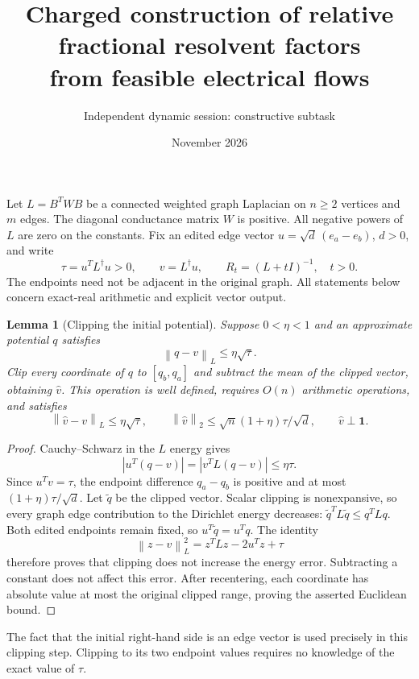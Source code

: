 \documentclass[11pt]{article}
\title{Charged construction of relative fractional resolvent factors\\from feasible electrical flows}
\author{Independent dynamic session: constructive subtask}
\date{November 2026}
\newtheorem{lemma}{Lemma}
\newcommand{\norm}[1]{\left\lVert #1\right\rVert}
\begin{document}
\maketitle

Let $L=B^TWB$ be a connected weighted graph Laplacian on $n\ge2$
vertices and $m$ edges.  The diagonal conductance matrix $W$ is positive.
All negative powers of $L$ are zero on the constants. Fix an edited edge
vector $u=\sqrt d\,(e_a-e_b)$, $d>0$, and write
\[
 \tau=u^TL^\dagger u>0,\qquad v=L^\dagger u,
 \qquad R_t=(L+tI)^{-1},\quad t>0.
\]
The endpoints need not be adjacent in the original graph. All statements
below concern exact-real arithmetic and explicit vector output.

\begin{lemma}[Clipping the initial potential]\label{lem:clip}
Suppose $0<\eta<1$ and an approximate potential $q$ satisfies
\[
 \norm{q-v}_L\le\eta\sqrt\tau.
\]
Clip every coordinate of $q$ to $[q_b,q_a]$ and subtract the mean of
the clipped vector, obtaining $\widehat v$. This operation is well
defined, requires $O(n)$ arithmetic operations, and satisfies
\[
 \norm{\widehat v-v}_L\le\eta\sqrt\tau,
 \qquad
 \norm{\widehat v}_2\le
       \sqrt n(1+\eta)\tau/\sqrt d,
 \qquad \widehat v\perp\mathbf1.
\]
\end{lemma}
\begin{proof}
Cauchy--Schwarz in the $L$ energy gives
\[
 |u^T(q-v)|=|v^TL(q-v)|\le\eta\tau.
\]
Since $u^Tv=\tau$, the endpoint difference $q_a-q_b$ is positive
and at most $(1+\eta)\tau/\sqrt d$.
Let $\widetilde q$ be the clipped vector. Scalar clipping is
nonexpansive, so every graph edge contribution to the Dirichlet energy
decreases: $\widetilde q^TL\widetilde q\le q^TLq$.
Both edited endpoints remain fixed, so $u^T\widetilde q=u^Tq$.
The identity
\[
 \norm{z-v}_L^2=z^TLz-2u^Tz+\tau
\]
therefore proves that clipping does not increase the energy error.
Subtracting a constant does not affect this error. After recentering,
each coordinate has absolute value at most the original clipped range,
proving the asserted Euclidean bound.
\end{proof}

The fact that the initial right-hand side is an edge vector is used
precisely in this clipping step. Clipping to its two endpoint values
requires no knowledge of the exact value of $\tau$.
\end{document}
